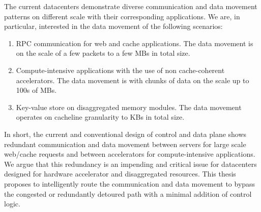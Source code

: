 %
The current datacenters demonstrate diverse communication and data movement patterns on different scale with their corresponding applications.
% 
We are, in particular, interested in the data movement of the following scenarios:
\begin{enumerate}[noitemsep]
    \item RPC communication for web and cache applications. The data movement is on the scale of a few packets to a few MBs in total size.
    \item Compute-intensive applications with the use of non cache-coherent accelerators. The data movement is with chunks of data on the scale up to 100s of MBs.
    \item Key-value store on disaggregated memory modules. The data movement operates on cacheline granularity to KBs in total size.  
\end{enumerate} 
%
In short, the current and conventional design of control and data plane shows redundant communication and data movement between servers for large scale web/cache requests and between accelerators for compute-intensive applications.
%
We argue that this redundancy is an impending and critical issue for datacenters designed for hardware accelerator and disaggregated resources. 
%
This thesis proposes to intelligently route the communication and data movement to bypass the congested or redundantly detoured path with a minimal addition of control logic. 
%




%
